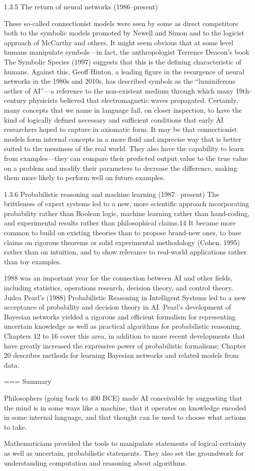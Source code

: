 1.3.5 The return of neural networks (1986–present)

These so-called connectionist models were seen by some as direct competitors both to the symbolic models promoted by Newell and Simon and to the logicist approach of McCarthy and others. It might seem obvious that at some level humans manipulate symbols—in fact, the anthropologist Terrence Deacon’s book The Symbolic Species (1997) suggests that this is the defining characteristic of humans. Against this, Geoff Hinton, a leading figure in the resurgence of neural networks in the 1980s and 2010s, has described symbols as the “luminiferous aether of AI”—a reference to the non-existent medium through which many 19th-century physicists believed that electromagnetic waves propagated. Certainly, many concepts that we name in language fail, on closer inspection, to have the kind of logically defined necessary and sufficient conditions that early AI researchers hoped to capture in axiomatic form. It may be that connectionist models form internal concepts in a more fluid and imprecise way that is better suited to the messiness of the real world. They also have the capability to learn from examples—they can compare their predicted output value to the
true value on a problem and modify their parameters to decrease the difference, making them more likely to perform well on future examples.


1.3.6 Probabilistic reasoning and machine learning (1987– present)
The brittleness of expert systems led to a new, more scientific approach incorporating probability rather than Boolean logic, machine learning rather than hand-coding, and experimental results rather than philosophical claims.14 It became more common to build on existing theories than to propose brand-new ones, to base claims on rigorous theorems or solid experimental methodology (Cohen, 1995) rather than on intuition, and to show relevance to real-world applications rather than toy examples.

1988 was an important year for the connection between AI and other fields, including statistics, operations research, decision theory, and control theory. Judea Pearl’s (1988) Probabilistic Reasoning in Intelligent Systems led to a new acceptance of probability and decision theory in AI. Pearl’s development of Bayesian networks yielded a rigorous and efficient formalism for representing uncertain knowledge as well as practical algorithms for probabilistic reasoning. Chapters 12 to 16 cover this area, in addition to more recent developments that have greatly increased the expressive power of probabilistic formalisms; Chapter 20 describes methods for learning Bayesian networks and related models from data.

=== Summary

Philosophers (going back to 400 BCE) made AI conceivable by suggesting that the mind is in some ways like a machine, that it operates on knowledge encoded in some internal language, and that thought can be used to choose what actions to take.

Mathematicians provided the tools to manipulate statements of logical certainty as well as uncertain, probabilistic statements. They also set the groundwork for understanding computation and reasoning about algorithms.